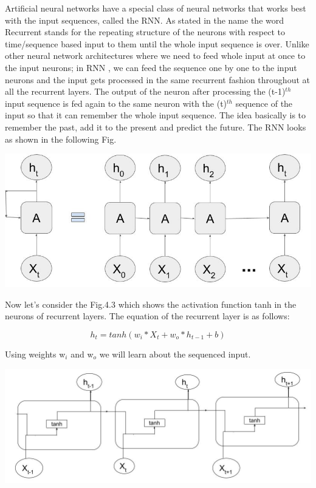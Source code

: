 Artificial neural networks have a special class of neural networks that works best with the input sequences, called the RNN. As stated in the name the word Recurrent stands for the repeating structure of the neurons with respect to time/sequence based input to them until the whole input sequence is over. Unlike other neural network architectures where we need to feed whole input at once to the input neurons; in RNN \cite{13}, we can feed the sequence one by one to the input neurons and the input gets processed in the same recurrent fashion throughout at all the recurrent layers. The output of the neuron after processing the (t-1)$^{th}$ input sequence is fed again to the same neuron with the (t)$^{th}$ sequence of the input so that it can remember the whole input sequence. The idea basically is to remember the past, add it to the present and predict the future. The RNN looks as shown in the following Fig.

				\begin{center}
				\includegraphics[width=\linewidth]{figures/An-unrolled-recurrent-neural-network.jpg}	
				\label{fig: Unfolded Recurrent layer}
				\end{center}


Now let’s consider the Fig.4.3 which shows the activation function tanh in the neurons of recurrent layers. The equation of the recurrent layer is as follows:

\begin{equation}
	h_{t} = tanh (w_{i} * X_{t} + w_{o} * h_{t-1} + b)
\end{equation}

Using weights w$_{i}$ and w$_{o}$ we will learn about the sequenced input.

				\begin{center}
				\includegraphics[width=\linewidth]{figures/The-repeating-module-in-a-standard-RNN.jpg}	
				\label{fig: Unfolded Recurrent layer with activation function}
				\end{center}


